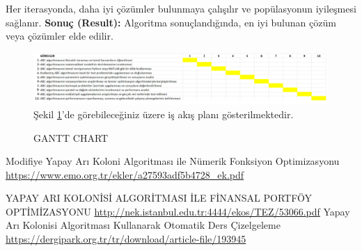 \documentclass[12pt,a4paper]{article}
\begin{document}
\begin{enumerate}
Her iterasyonda, daha iyi çözümler bulunmaya çalışılır ve popülasyonun iyileşmesi sağlanır.\newline
{\bf\fontsize{10pt}{12pt}\selectfont Sonuç (Result):}
Algoritma sonuçlandığında, en iyi bulunan çözüm veya çözümler elde edilir.
\newline
  \begin{figure}[h]
  	\caption{GANTT CHART}
  	\vspace{1cm} 
  	\centering
  \includegraphics[width=\textwidth,height=\textheight,keepaspectratio]{gantt chart.png}
  	\label{gantt}
  		\vspace{1cm} 
  	Şekil \ref{gantt}'de görebileceğiniz üzere
  	iş akış planı gösterilmektedir.
  \end{figure}


    \end{enumerate}
\begin{itemize}

	
	
  
   Modifiye Yapay Arı Koloni Algoritması ile Nümerik Fonksiyon Optimizasyonu 
  \url{ https://www.emo.org.tr/ekler/a27593adf5b4728_ek.pdf}
  
 YAPAY ARI KOLONİSİ ALGORİTMASI İLE FİNANSAL
PORTFÖY OPTİMİZASYONU
  \url{http://nek.istanbul.edu.tr:4444/ekos/TEZ/53066.pdf}
  Yapay Arı Kolonisi Algoritması Kullanarak Otomatik Ders Çizelgeleme
  \url{ https://dergipark.org.tr/tr/download/article-file/193945}
 


\end{itemize} 
\end{document}
